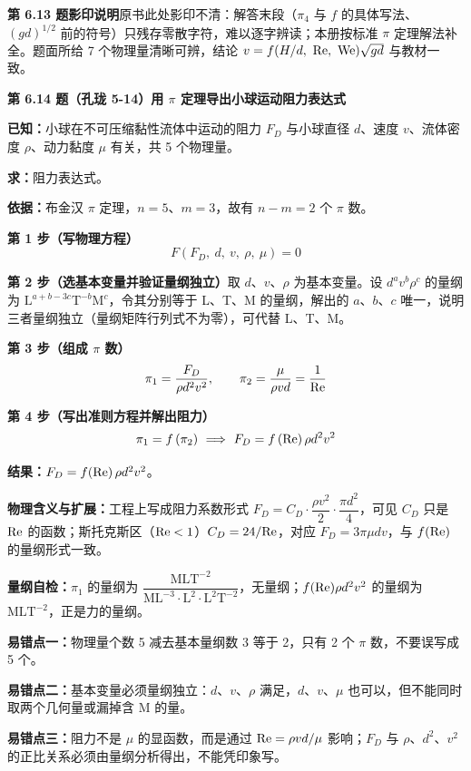 \begin{tishi}
\noindent\textbf{第 6.13 题影印说明}\quad 原书此处影印不清：解答末段（$\pi_4$ 与 $f$ 的具体写法、$(gd)^{1/2}$ 前的符号）只残存零散字符，难以逐字辨读；本册按标准 $\pi$ 定理解法补全。题面所给 7 个物理量清晰可辨，结论 $v=f(H/d,\ \mathrm{Re},\ \mathrm{We})\sqrt{gd}$ 与教材一致。
\end{tishi}

\noindent\textbf{第 6.14 题（孔珑 5-14）\quad 用 $\pi$ 定理导出小球运动阻力表达式}

\begin{jie}
\textbf{已知：}小球在不可压缩黏性流体中运动的阻力 $F_D$ 与小球直径 $d$、速度 $v$、流体密度 $\rho$、动力黏度 $\mu$ 有关，共 5 个物理量。

\textbf{求：}阻力表达式。

\textbf{依据：}布金汉 $\pi$ 定理，$n=5$、$m=3$，故有 $n-m=2$ 个 $\pi$ 数。

\textbf{第 1 步（写物理方程）}\quad
\[F\left(F_D,\ d,\ v,\ \rho,\ \mu\right)=0\]

\textbf{第 2 步（选基本变量并验证量纲独立）}\quad 取 $d$、$v$、$\rho$ 为基本变量。设 $d^{a}v^{b}\rho^{c}$ 的量纲为 $\mathrm{L}^{a+b-3c}\mathrm{T}^{-b}\mathrm{M}^{c}$，令其分别等于 L、T、M 的量纲，解出的 $a$、$b$、$c$ 唯一，说明三者量纲独立（量纲矩阵行列式不为零），可代替 L、T、M。

\textbf{第 3 步（组成 $\pi$ 数）}\quad
\[\pi_1=\frac{F_D}{\rho d^{2}v^{2}},\qquad \pi_2=\frac{\mu}{\rho vd}=\frac{1}{\mathrm{Re}}\]

\textbf{第 4 步（写出准则方程并解出阻力）}\quad
\[\pi_1=f\left(\pi_2\right)\ \Longrightarrow\ F_D=f\left(\Rey\right)\rho d^{2}v^{2}\]

\textbf{结果：}$F_D=f(\mathrm{Re})\,\rho d^{2}v^{2}$。

\textbf{物理含义与扩展：}工程上写成阻力系数形式 $F_D=C_D\cdot\dfrac{\rho v^{2}}{2}\cdot\dfrac{\pi d^{2}}{4}$，可见 $C_D$ 只是 $\mathrm{Re}$ 的函数；斯托克斯区（$\mathrm{Re}<1$）$C_D=24/\mathrm{Re}$，对应 $F_D=3\pi\mu dv$，与 $f(\mathrm{Re})$ 的量纲形式一致。

\textbf{量纲自检：}$\pi_1$ 的量纲为 $\dfrac{\mathrm{MLT^{-2}}}{\mathrm{ML^{-3}}\cdot\mathrm{L^{2}}\cdot\mathrm{L^{2}T^{-2}}}$，无量纲；$f(\mathrm{Re})\rho d^{2}v^{2}$ 的量纲为 $\mathrm{MLT^{-2}}$，正是力的量纲。
\end{jie}

\begin{yicuo}
\textbf{易错点一：}物理量个数 5 减去基本量纲数 3 等于 2，只有 2 个 $\pi$ 数，不要误写成 5 个。

\textbf{易错点二：}基本变量必须量纲独立：$d$、$v$、$\rho$ 满足，$d$、$v$、$\mu$ 也可以，但不能同时取两个几何量或漏掉含 M 的量。

\textbf{易错点三：}阻力不是 $\mu$ 的显函数，而是通过 $\mathrm{Re}=\rho vd/\mu$ 影响；$F_D$ 与 $\rho$、$d^{2}$、$v^{2}$ 的正比关系必须由量纲分析得出，不能凭印象写。
\end{yicuo}

